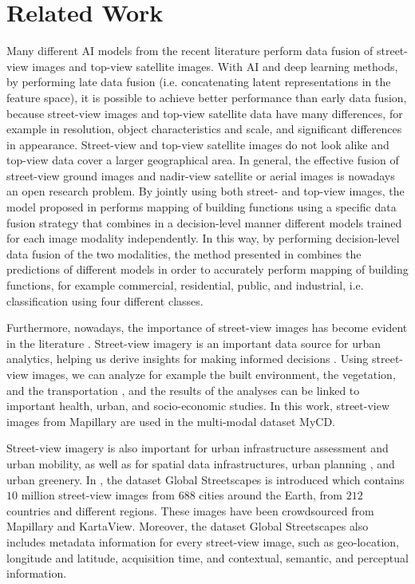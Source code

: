 \section{Related Work}
\label{sec:rel}                           
Many different AI models from the recent literature perform data fusion of street-view images and top-view satellite images.         
With AI and deep learning methods, by performing late data fusion (i.e. concatenating latent representations in the feature space), it is possible to achieve better performance than early data fusion, because street-view images and top-view satellite data have many differences, for example in resolution, object characteristics and scale, and significant differences in appearance.   
Street-view and top-view satellite images do not look alike and top-view data cover a larger geographical area.  
In general, the effective fusion of street-view ground images and nadir-view satellite or aerial images is nowadays an open research problem.       
By jointly using both street- and top-view images, the model proposed in \cite{Zhu1} performs mapping of building functions using a specific data fusion strategy that combines in a decision-level manner different models trained for each image modality independently.         
In this way, by performing decision-level data fusion of the two modalities, the method presented in \cite{Zhu1} combines the predictions of different models in order to accurately perform mapping of building functions, for example commercial, residential, public, and industrial, i.e. classification using four different classes.

Furthermore, nowadays, the importance of street-view images has become evident in the literature \cite{StreetView1}.    
Street-view imagery is an important data source for urban analytics, helping us derive insights for making informed decisions \cite{chen2024global}.   
Using street-view images, we can analyze for example the built environment, the vegetation, and the transportation \cite{StreetView1}, and the results of the analyses can be linked to important health, urban, and socio-economic studies.    
In this work, street-view images from Mapillary are used in the multi-modal dataset MyCD.

Street-view imagery is also important for urban infrastructure assessment \cite{2024_global_streetscapes} and urban mobility, as well as for spatial data infrastructures, urban planning \cite{streetpaper}, and urban greenery.  
In \cite{2024_global_streetscapes}, the dataset Global Streetscapes is introduced which contains $10$ million street-view images from $688$ cities around the Earth, from $212$ countries and different regions.     
These images have been crowdsourced from Mapillary and KartaView.         
Moreover, the dataset Global Streetscapes \cite{2024_global_streetscapes} also includes metadata information for every street-view image, such as geo-location, longitude and latitude, acquisition time, and contextual, semantic, and perceptual information.

